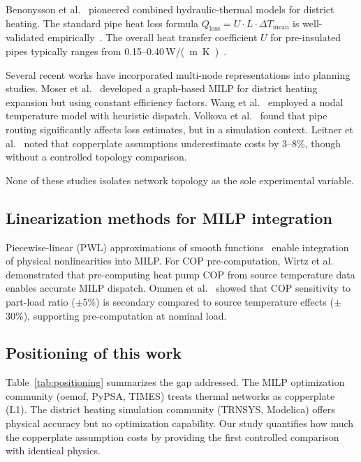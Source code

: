\documentclass[a4paper,fleqn]{cas-dc}
\begin{document}
Benonysson et al.~\citep{Benonysson1995} pioneered combined hydraulic-thermal models for district heating. The standard pipe heat loss formula $Q_\mathrm{loss} = U \cdot L \cdot \Delta T_\mathrm{mean}$ is well-validated empirically~\citep{Frederiksen2013}. The overall heat transfer coefficient $U$ for pre-insulated pipes typically ranges from 0.15--0.40\,\si{W/(m.K)}~\citep{vanderHeijde2017}.

Several recent works have incorporated multi-node representations into planning studies. Moser et al.~\citep{Moser2019} developed a graph-based MILP for district heating expansion but using constant efficiency factors. Wang et al.~\citep{Wang2020} employed a nodal temperature model with heuristic dispatch. Volkova et al.~\citep{Volkova2019} found that pipe routing significantly affects loss estimates, but in a simulation context. Leitner et al.~\citep{Leitner2018} noted that copperplate assumptions underestimate costs by 3--8\%, though without a controlled topology comparison.

None of these studies isolates network topology as the sole experimental variable.

\subsection{Linearization methods for MILP integration}

Piecewise-linear (PWL) approximations of smooth functions~\citep{Rebennack2016} enable integration of physical nonlinearities into MILP. For COP pre-computation, Wirtz et al.~\citep{Wirtz2018} demonstrated that pre-computing heat pump COP from source temperature data enables accurate MILP dispatch. Ommen et al.~\citep{Ommen2016} showed that COP sensitivity to part-load ratio ($\pm$5\%) is secondary compared to source temperature effects ($\pm$30\%), supporting pre-computation at nominal load.

\subsection{Positioning of this work}

Table~\ref{tab:positioning} summarizes the gap addressed. The MILP optimization community (oemof, PyPSA, TIMES) treats thermal networks as copperplate (L1). The district heating simulation community (TRNSYS, Modelica) offers physical accuracy but no optimization capability. Our study quantifies how much the copperplate assumption costs by providing the first controlled comparison with identical physics.
\end{document}
